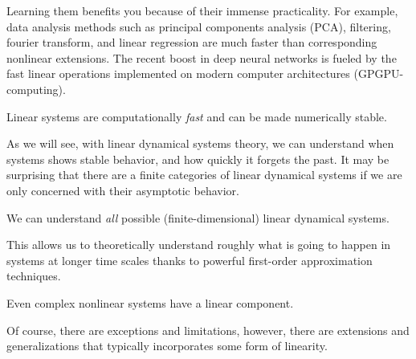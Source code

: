 \documentclass[a4paper,11pt]{exam}
\newcounter{ct}
\begin{document}
Learning them benefits you because of their immense practicality.
For example, data analysis methods such as principal components analysis (PCA), filtering, fourier transform, and linear regression are much faster than corresponding nonlinear extensions.
The recent boost in deep neural networks is fueled by the fast linear operations implemented on modern computer architectures (GPGPU-computing).
\begin{tcolorbox}[colback=black!1!,title=Saves you time and the planet]
    Linear systems are computationally \emph{fast} and can be made numerically stable.
\end{tcolorbox}
As we will see, with linear dynamical systems theory, we can understand when systems shows stable behavior, and how quickly it forgets the past.
It may be surprising that there are a finite categories of linear dynamical systems if we are only concerned with their asymptotic behavior.
\begin{tcolorbox}[colback=black!1!,title=Easy asymptotic theory]
    We can understand \emph{all} possible (finite-dimensional) linear dynamical systems.
\end{tcolorbox}
This allows us to theoretically understand roughly what is going to happen in systems at longer time scales thanks to powerful first-order approximation techniques.
\begin{tcolorbox}[colback=black!1!,title=Linearize (locally)]
    Even complex nonlinear systems have a linear component.
\end{tcolorbox}
Of course, there are exceptions and limitations, however, there are extensions and generalizations that typically incorporates some form of linearity.
\end{document}

